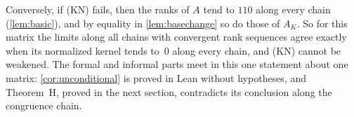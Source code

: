 Conversely, if (KN) fails, then the ranks of $A$ tend to $110$ along every chain (\cref{lem:basic}), and by equality in
\cref{lem:basechange} so do those of $A_K$. So for this matrix the limits along all chains with convergent rank sequences
agree exactly when its normalized kernel tends to~$0$ along every chain, and (KN) cannot be weakened. The formal and
informal parts meet in this one statement about one matrix: \cref{cor:unconditional} is proved in Lean without
hypotheses, and Theorem~H, proved in the next section, contradicts its conclusion along the congruence chain.
